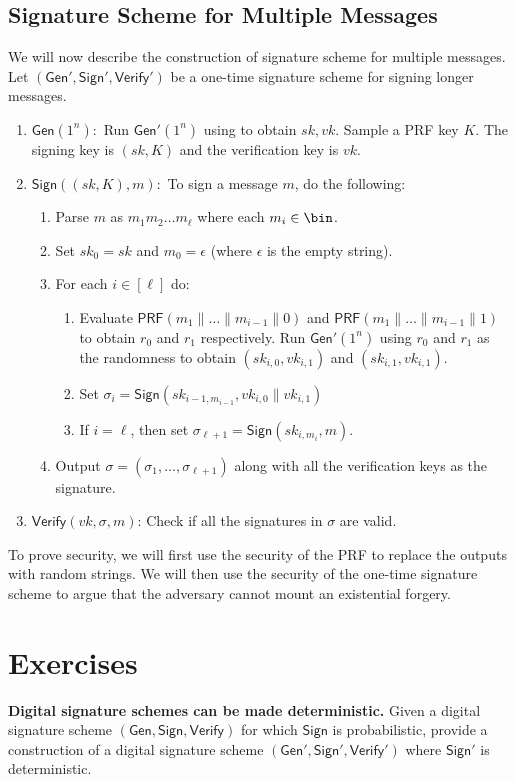 \documentclass[12pt]{tufte-book}
\newcommand{\Gen}{\mathsf{Gen}}
\newcommand{\Sign}{\mathsf{Sign}}
\newcommand{\Verify}{\mathsf{Verify}}
\newcommand{\PRF}{\mathsf{PRF}}
\providecommand{\DIFaddbegin}{} %
\newcommand{\DIFaddincludegraphics}[2][]{{\color{blue}\fbox{\DIFOincludegraphics[#1]{#2}}}} %
\DeclareRobustCommand{\DIFaddbegin}{\DIFOaddbegin \let\includegraphics\DIFaddincludegraphics} %
\begin{document}
\subsection{Signature Scheme for Multiple Messages}
We will now describe the construction of signature scheme for multiple messages. Let $(\Gen',\Sign',\Verify')$ be a one-time signature scheme for signing longer messages. 
\begin{enumerate}
    \item $\Gen(1^n):$ Run $\Gen'(1^n)$ using to obtain $sk,vk$. Sample a PRF key $K$. The signing key is $(sk,K)$ and the verification key is $vk$.
    \item $\Sign((sk,K),m):$ To sign a message $m$, do the following:
    \begin{enumerate}
        \item Parse $m$ as $m_1m_2\ldots m_{\ell}$ where each $m_i \in \bin$.
        \item Set $sk_0 = sk$ and $m_0 = \epsilon$ (where $\epsilon$ is the empty string).
        \item For each $i \in [\ell]$ do:
        \begin{enumerate}
            \item Evaluate $\PRF(m_1\|\ldots\|m_{i-1}\|0)$ and $\PRF(m_1\|\ldots\|m_{i-1}\|1)$ to obtain $r_0$ and $r_1$ respectively. Run $\Gen'(1^n)$ using $r_0$ and $r_1$ as the randomness to obtain $(sk_{i,0},vk_{i,1})$ and $(sk_{i,1},vk_{i,1})$.
            \item Set $\sigma_i = \Sign(sk_{i-1,m_{i-1}},vk_{i,0}\|vk_{i,1})$
            \item If $i = \ell$, then set $\sigma_{\ell+1} = \Sign(sk_{i,m_i},m)$.

        \end{enumerate}
        \item Output $\sigma = (\sigma_1,\ldots,\sigma_{\ell+1})$ along with all the verification keys as the signature.
    \end{enumerate}
    \item $\Verify(vk,\sigma,m)$: Check if all the signatures in $\sigma$ are valid.
\end{enumerate}

To prove security, we will first use the security of the PRF to replace the outputs with random strings. We will then use the security of the one-time signature scheme to argue that the adversary cannot mount an existential forgery.

\section*{Exercises}
\begin{exercise}
\textbf{Digital signature schemes can be made deterministic.} Given a digital signature scheme $(\mathsf{Gen}, \mathsf{Sign}, \mathsf{Verify})$ for which $\mathsf{Sign}$ is probabilistic, provide a construction of a digital signature scheme $(\mathsf{Gen}', \mathsf{Sign}', \mathsf{Verify}')$ where $\mathsf{Sign}'$ is deterministic.
\end{exercise}
\DIFaddbegin 
\end{document}
